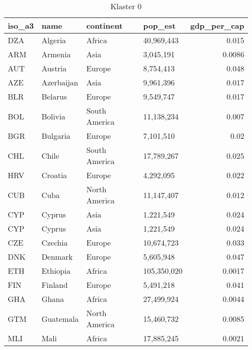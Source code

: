 \begin{table}
    \centering
    \caption{Klaster 0}
    \label{tab:cl0}
    \begin{tabular}{llllr}
        \toprule
        iso\_a3 & name         & continent     & pop\_est    & gdp\_per\_cap \\
        \midrule
        DZA     & Algeria      & Africa        & 40,969,443  & 0.015         \\
        ARM     & Armenia      & Asia          & 3,045,191   & 0.0086        \\
        AUT     & Austria      & Europe        & 8,754,413   & 0.048         \\
        AZE     & Azerbaijan   & Asia          & 9,961,396   & 0.017         \\
        BLR     & Belarus      & Europe        & 9,549,747   & 0.017         \\
        BOL     & Bolivia      & South America & 11,138,234  & 0.007         \\
        BGR     & Bulgaria     & Europe        & 7,101,510   & 0.02          \\
        CHL     & Chile        & South America & 17,789,267  & 0.025         \\
        HRV     & Croatia      & Europe        & 4,292,095   & 0.022         \\
        CUB     & Cuba         & North America & 11,147,407  & 0.012         \\
        CYP     & Cyprus       & Asia          & 1,221,549   & 0.024         \\
        CYP     & Cyprus       & Asia          & 1,221,549   & 0.024         \\
        CZE     & Czechia      & Europe        & 10,674,723  & 0.033         \\
        DNK     & Denmark      & Europe        & 5,605,948   & 0.047         \\
        ETH     & Ethiopia     & Africa        & 105,350,020 & 0.0017        \\
        FIN     & Finland      & Europe        & 5,491,218   & 0.041         \\
        GHA     & Ghana        & Africa        & 27,499,924  & 0.0044        \\
        GTM     & Guatemala    & North America & 15,460,732  & 0.0085        \\
        MLI     & Mali         & Africa        & 17,885,245  & 0.0021        \\

\end{tabular}
\end{table}
